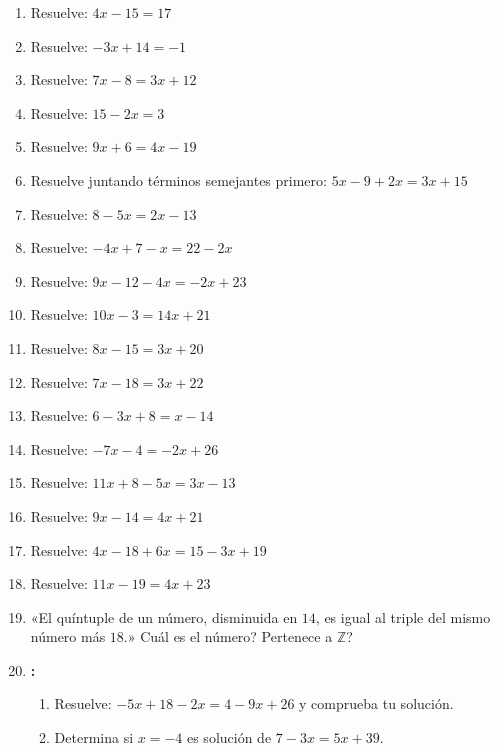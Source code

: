 \documentclass[12pt, letterpaper]{article}
\newcommand{\Z}{\mathbb{Z}}
\begin{document}
\begin{enumerate}[leftmargin=*, start=41]
  \item \facil{} Resuelve: $4x - 15 = 17$

  \item \facil{} Resuelve: $-3x + 14 = -1$

  \item \facil{} Resuelve: $7x - 8 = 3x + 12$

  \item \facil{} Resuelve: $15 - 2x = 3$

  \item \facil{} Resuelve: $9x + 6 = 4x - 19$

  \item \medio{} Resuelve juntando términos semejantes primero: $5x - 9 + 2x = 3x + 15$

  \item \medio{} Resuelve: $8 - 5x = 2x - 13$

  \item \medio{} Resuelve: $-4x + 7 - x = 22 - 2x$

  \item \medio{} Resuelve: $9x - 12 - 4x = -2x + 23$

  \item \medio{} Resuelve: $10x - 3 = 14x + 21$

  \item \medio{} Resuelve: $8x - 15 = 3x + 20$

  \item \medio{} Resuelve: $7x - 18 = 3x + 22$

  \item \medio{} Resuelve: $6 - 3x + 8 = x - 14$

  \item \medio{} Resuelve: $-7x - 4 = -2x + 26$

  \item \medio{} Resuelve: $11x + 8 - 5x = 3x - 13$

  \item \dificil{} Resuelve: $9x - 14 = 4x + 21$

  \item \dificil{} Resuelve: $4x - 18 + 6x = 15 - 3x + 19$

  \item \dificil{} Resuelve: $11x - 19 = 4x + 23$

  \item \dificil{} «El quíntuple de un número, disminuida en $14$, es igual al triple del mismo número más $18$.» \textquestiondown Cuál es el número? \textquestiondown Pertenece a $\Z$?

  \item \dificil{} \textbf{:}
        \begin{enumerate}[label=\alph*)]
          \item Resuelve: $-5x + 18 - 2x = 4 - 9x + 26$ y comprueba tu solución.
          \item Determina si $x = -4$ es solución de $7 - 3x = 5x + 39$.
        \end{enumerate}
\end{enumerate}
\end{document}

